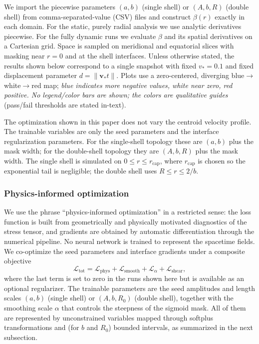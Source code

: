 \documentclass[11pt]{article}
\begin{document}
We import the piecewise parameters $(a,b)$ (single shell) or $(A,b,R)$ (double shell) from comma-separated-value (CSV) files and construct $\beta(r)$ exactly in each domain. For the static, purely radial analysis we use analytic derivatives piecewise. For the fully dynamic runs we evaluate $\beta$ and its spatial derivatives on a Cartesian grid. Space is sampled on meridional and equatorial slices with masking near $r=0$ and at the shell interfaces. Unless otherwise stated, the results shown below correspond to a single snapshot with fixed $v_*=0.1$ and fixed displacement parameter $d=\|\mathbf v_* t\|$. Plots use a zero-centered, diverging blue$\to$white$\to$red map; \emph{blue indicates more negative values, white near zero, red positive. No legend/color bars are shown; the colors are qualitative guides} (pass/fail thresholds are stated in-text).

The optimization shown in this paper does not vary the centroid velocity profile. The trainable variables are only the seed parameters and the interface regularization parameters. For the single-shell topology these are $(a,b)$ plus the mask width; for the double-shell topology they are $(A,b,R)$ plus the mask width. The single shell is simulated on $0\le r\le r_{\text{cap}}$, where $r_{\text{cap}}$ is chosen so the exponential tail is negligible; the double shell uses $R\le r\le 2/b$.

\subsubsection{Physics-informed optimization}
We use the phrase ``physics-informed optimization'' in a restricted sense: the loss function is built from geometrically and physically motivated diagnostics of the stress tensor, and gradients are obtained by automatic differentiation through the numerical pipeline. No neural network is trained to represent the spacetime fields.
We co-optimize the seed parameters and interface gradients under a composite objective
\[
\mathcal{L}_\text{tot} = \mathcal{L}_\text{phys} + \mathcal{L}_\text{smooth} + \mathcal{L}_\alpha + \mathcal{L}_\text{shear},
\]
where the last term is set to zero in the runs shown here but is available as an optional regularizer. The trainable parameters are the seed amplitudes and length scales $(a,b)$ (single shell) or $(A,b,R_0)$ (double shell), together with the smoothing scale $\alpha$ that controls the steepness of the sigmoid mask. All of them are represented by unconstrained variables mapped through softplus transformations and (for $b$ and $R_0$) bounded intervals, as summarized in the next subsection.
\end{document}
